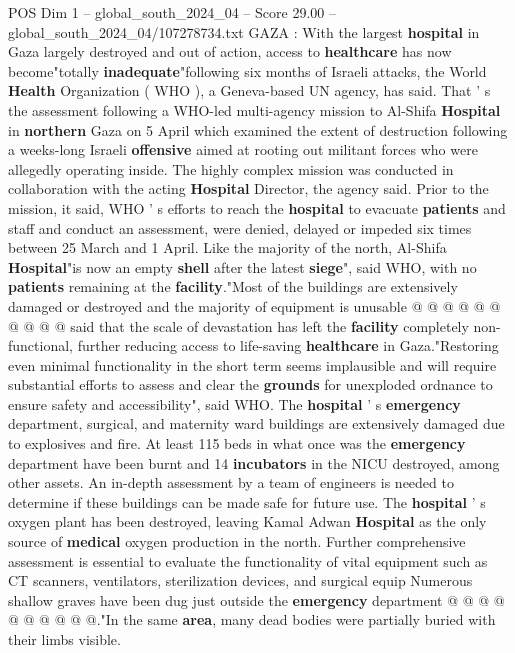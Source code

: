 \begin{textsample}{POS Dim 1 – global\_south\_2024\_04 – Score 29.00 – global\_south\_2024\_04/107278734.txt}  \label{ex:f1_pos_149}
GAZA : With the largest \textbf{hospital} in Gaza largely destroyed and out of action, access to \textbf{healthcare} has now become"totally \textbf{inadequate}"following six months of Israeli attacks, the World \textbf{Health} Organization ( WHO ), a Geneva-based UN agency, has said.
That ' s the assessment following a WHO-led multi-agency mission to Al-Shifa \textbf{Hospital} in \textbf{northern} Gaza on 5 April which examined the extent of destruction following a weeks-long Israeli \textbf{offensive} aimed at rooting out militant forces who were allegedly operating inside.
The highly complex mission was conducted in collaboration with the acting \textbf{Hospital} Director, the agency said.
Prior to the mission, it said, WHO ' s efforts to reach the \textbf{hospital} to evacuate \textbf{patients} and staff and conduct an assessment, were denied, delayed or impeded six times between 25 March and 1 April.
Like the majority of the north, Al-Shifa \textbf{Hospital}"is now an empty \textbf{shell} after the latest \textbf{siege}", said WHO, with no \textbf{patients} remaining at the \textbf{facility}."Most of the buildings are extensively damaged or destroyed and the majority of equipment is unusable @ @ @ @ @ @ @ @ @ @ said that the scale of devastation has left the \textbf{facility} completely non-functional, further reducing access to life-saving \textbf{healthcare} in Gaza."Restoring even minimal functionality in the short term seems implausible and will require substantial efforts to assess and clear the \textbf{grounds} for unexploded ordnance to ensure safety and accessibility", said WHO.
The \textbf{hospital} ' s \textbf{emergency} department, surgical, and maternity ward buildings are extensively damaged due to explosives and fire.
At least 115 beds in what once was the \textbf{emergency} department have been burnt and 14 \textbf{incubators} in the NICU destroyed, among other assets.
An in-depth assessment by a team of engineers is needed to determine if these buildings can be made safe for future use.
The \textbf{hospital} ' s oxygen plant has been destroyed, leaving Kamal Adwan \textbf{Hospital} as the only source of \textbf{medical} oxygen production in the north.
Further comprehensive assessment is essential to evaluate the functionality of vital equipment such as CT scanners, ventilators, sterilization devices, and surgical equip Numerous shallow graves have been dug just outside the \textbf{emergency} department @ @ @ @ @ @ @ @ @ @."In the same \textbf{area}, many dead bodies were partially buried with their limbs visible.

\end{textsample}
